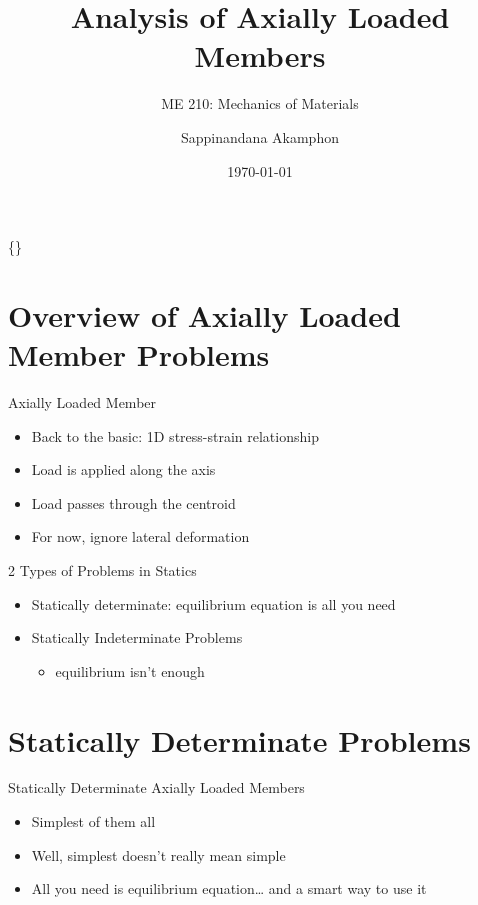 \documentclass[10pt, svgnames]{beamer}
\author{Sappinandana Akamphon}
\date{\today}
\title{Analysis of Axially Loaded Members}
\subtitle{ME 210: Mechanics of Materials}
\institute{Department of Mechanical Engineering, TSE}
\date{}
\begin{document}
\begin{frame}[label={sec:orgaa38fa4}]{\{\}}
\maketitle
\end{frame}

\section{Overview of Axially Loaded Member Problems}
\label{overview-of-axially-loaded-member-problems}
\begin{frame}[label={sec:orgaf5587b}]{Axially Loaded Member}
\begin{itemize}
\item Back to the basic: 1D stress-strain relationship

\item Load is applied along the axis

\item Load passes through the centroid

\item For now, ignore lateral deformation
\end{itemize}
\end{frame}

\begin{frame}[label={sec:org33e8e26}]{2 Types of Problems in Statics}
\begin{itemize}
\item Statically determinate: equilibrium equation is all you need

\item Statically Indeterminate Problems

\begin{itemize}
\item equilibrium isn't enough
\end{itemize}
\end{itemize}
\end{frame}

\section{Statically Determinate Problems}
\label{statically-determinate-problems}
\begin{frame}[label={sec:org12f3eec}]{Statically Determinate Axially Loaded Members}
\begin{itemize}
\item Simplest of them all

\item Well, simplest doesn't really mean simple

\item All you need is equilibrium equation\ldots{} and a smart way to use it
\end{itemize}
\end{frame}
\end{document}
